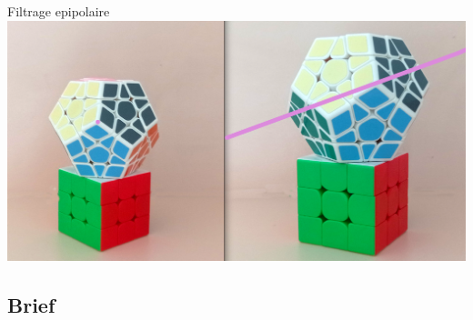 \begin{frame}{Filtrage epipolaire}
  \includegraphics[width=\linewidth]{capture/ligne.png}\\[0.5em]
\end{frame}


\subsection{Brief}

